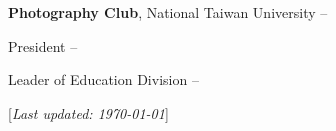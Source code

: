 \documentclass[a4paper,12pt,oneside]{article}
\newcommand{\CVNote}{Last updated: {\today}}
\begin{document}
\begin{body}
\BigEntryGap
\textbf{Photography Club},
National Taiwan University
\hfill
{} --

President
\hfill
{} --

Leader of Education Division
\hfill
{} --

%
\end{body}


\begin{flushright}
\scriptsize%
[\textit{\CVNote}]%
\hspace{2.0mm}\null
\end{flushright}

\label{LastPage}
\end{document}
